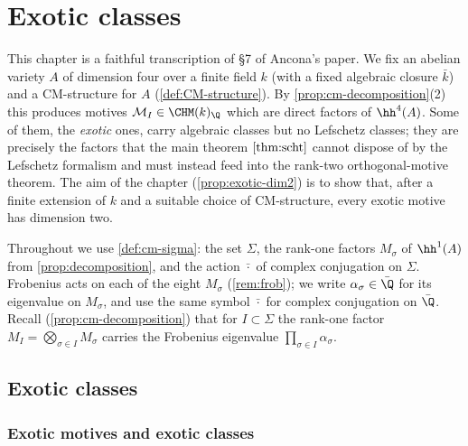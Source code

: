 \chapter{Exotic classes}

\providecommand{\Frob}{\mathrm{Frob}}

This chapter is a faithful transcription of \S7 of Ancona's paper. We fix an
abelian variety \(A\) of dimension four over a finite field \(k\) (with a fixed
algebraic closure \(\bar k\)) and a CM-structure for \(A\)
(\cref{def:CM-structure}). By \cref{prop:cm-decomposition}(2) this produces
motives \(\mathcal{M}_I \in \CHM(k)_{\Q}\) which are direct factors of
\(\hh^{4}(A)\). Some of them, the \emph{exotic} ones, carry algebraic classes
but no Lefschetz classes; they are precisely the factors that the main theorem
\(\cref{thm:scht}\) cannot dispose of by the Lefschetz formalism and must instead
feed into the rank-two orthogonal-motive theorem. The aim of the chapter
(\cref{prop:exotic-dim2}) is to show that, after a finite extension of \(k\) and a
suitable choice of CM-structure, every exotic motive has dimension two.

Throughout we use \cref{def:cm-sigma}: the set \(\Sigma\), the rank-one factors
\(M_\sigma\) of \(\hh^1(A)\) from \cref{prop:decomposition}, and the action
\(\bar{\cdot}\) of complex conjugation on \(\Sigma\). Frobenius acts on each of
the eight \(M_\sigma\) (\cref{rem:frob}); we write \(\alpha_\sigma \in \bar\Q\)
for its eigenvalue on \(M_\sigma\), and use the same symbol \(\bar{\cdot}\) for
complex conjugation on \(\bar\Q\). Recall (\cref{prop:cm-decomposition}) that for
\(I \subset \Sigma\) the rank-one factor \(M_I = \bigotimes_{\sigma \in I}
M_\sigma\) carries the Frobenius eigenvalue \(\prod_{\sigma \in I} \alpha_\sigma\).

\section{Exotic classes}

\subsection*{Exotic motives and exotic classes}

